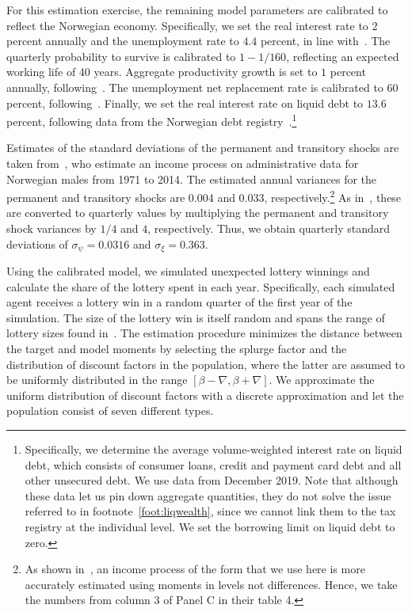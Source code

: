 \documentclass[\latexroot/\projectname]{subfiles}
\begin{document}


For this estimation exercise, the remaining model parameters are calibrated to reflect the Norwegian economy.
Specifically, we set the real interest rate to $2$ percent annually and the unemployment rate to $4.4$ percent, in line with~\cite{aursland-state-dependent-2020}.
The quarterly probability to survive is calibrated to $1-1/160$, reflecting an expected working life of 40 years.
Aggregate productivity growth is set to $1$ percent annually, following~\cite{kravik-navigating-2019}.
The unemployment net replacement rate is calibrated to $60$ percent, following~\cite{oecdReplacement}.
Finally, we set the real interest rate on liquid debt to $13.6$ percent, following data from the Norwegian debt registry~\cite{gjeldsregistret-nokkeltall-2022}.\footnote{Specifically, we determine the average volume-weighted interest rate on liquid debt, which consists of consumer loans, credit and payment card debt and all other unsecured debt.
  We use data from December 2019.
  Note that although these data let us pin down aggregate quantities, they do not solve the issue referred to in footnote~\ref{foot:liqwealth}, since we cannot link them to the tax registry at the individual level.
  We set the borrowing limit on liquid debt to zero.}

Estimates of the standard deviations of the permanent and transitory shocks are taken from~\cite{crawley2024Parsimonious}, who estimate an income process on administrative data for Norwegian males from 1971 to 2014.
The estimated annual variances for the permanent and transitory shocks are 0.004 and 0.033, respectively.\footnote{As shown in~\cite{crawley2024Parsimonious}, an income process of the form that we use here is more accurately estimated using moments in levels not differences.
  Hence, we take the numbers from column 3 of Panel C in their table 4.} As in~\cite{carroll2020sticky}, these are converted to quarterly values by multiplying the permanent and transitory shock variances by $1/4$ and $4$, respectively.
Thus, we obtain quarterly standard deviations of $\sigma_\psi=0.0316$ and $\sigma_\xi=0.363$.

Using the calibrated model, we simulated unexpected lottery winnings and calculate the share of the lottery spent in each year.
Specifically, each simulated agent receives a lottery win in a random quarter of the first year of the simulation.
The size of the lottery win is itself random and spans the range of lottery sizes found in~\cite{fagereng-mpc-2021}.
The estimation procedure minimizes the distance between the target and model moments by selecting the splurge factor and the distribution of discount factors in the population, where the latter are assumed to be uniformly distributed in the range $[\beta-\nabla, \beta+\nabla]$.
We approximate the uniform distribution of discount factors with a discrete approximation and let the population consist of seven different types.
\end{document}
